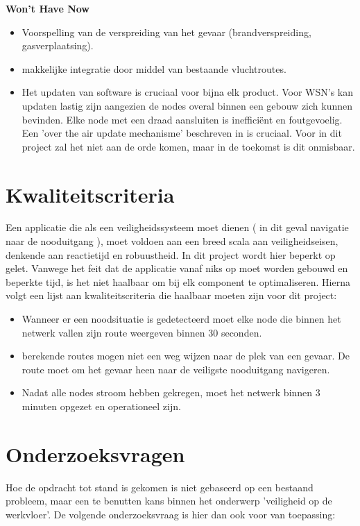 \documentclass{../local}
\begin{document}
\noindent\textbf{Won't Have Now}
\begin{itemize}
\item Voorspelling van de verspreiding van het gevaar (brandverspreiding, gasverplaatsing).
\item makkelijke integratie door middel van bestaande vluchtroutes.
\item Het updaten van software is cruciaal voor bijna elk product. Voor WSN's kan updaten lastig zijn aangezien de nodes overal binnen een gebouw zich kunnen bevinden. Elke node met een draad aansluiten is inefficiënt en foutgevoelig. Een 'over the air update mechanisme' beschreven in \cite{StatRUP} is cruciaal. Voor in dit project zal het niet aan de orde komen, maar in de toekomst is dit onmisbaar.
\end{itemize}

\section{Kwaliteitscriteria}
Een applicatie die als een veiligheidssysteem moet dienen ( in dit geval navigatie naar de nooduitgang ), moet voldoen aan een breed scala aan veiligheidseisen, denkende aan reactietijd en robuustheid. In dit project wordt hier beperkt op gelet. Vanwege het feit dat de applicatie vanaf niks op moet worden gebouwd en beperkte tijd, is het niet haalbaar om bij elk component te optimaliseren. Hierna volgt een lijst aan kwaliteitscriteria die haalbaar moeten zijn voor dit project:

\begin{itemize}
\item Wanneer er een noodsituatie is gedetecteerd moet elke node die binnen het netwerk vallen zijn route  weergeven binnen 30 seconden.
\item berekende routes mogen niet een weg wijzen naar de plek van een gevaar. De route moet om het gevaar heen naar de veiligste nooduitgang navigeren.
\item Nadat alle nodes stroom hebben gekregen, moet het netwerk binnen 3 minuten opgezet en operationeel zijn.
\end{itemize}

\section{Onderzoeksvragen}
Hoe de opdracht tot stand is gekomen is niet gebaseerd op een bestaand probleem, maar een te benutten kans binnen het onderwerp 'veiligheid op de werkvloer'. De volgende onderzoeksvraag is hier dan ook voor van toepassing:
\end{document}
